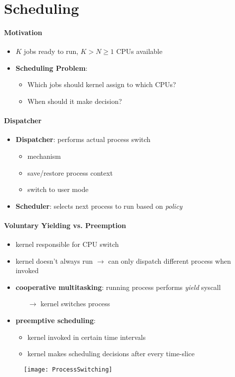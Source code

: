 \section{Scheduling}

\paragraph{Motivation}
\begin{itemize}
  \item \( K \) jobs ready to run, \( K > N \geq 1 \) CPUs available
  \item \textbf{Scheduling Problem}:
  \begin{itemize}
    \item Which jobs should kernel assign to which CPUs?
    \item When should it make decision?
  \end{itemize}
\end{itemize}

\paragraph{Dispatcher}
\begin{itemize}
  \item \textbf{Dispatcher}: performs actual process switch
  \begin{itemize}
    \item mechanism
    \item save/restore process context
    \item switch to user mode
  \end{itemize}
  \item \textbf{Scheduler}: selects next process to run based on \emph{policy}
\end{itemize}

\paragraph{Voluntary Yielding vs. Preemption}
\begin{itemize}
  \item kernel responsible for CPU switch
  \item kernel doesn't always run \( \to \) can only dispatch different process when invoked
  \item \textbf{cooperative multitasking}: running process performs \emph{yield} syscall
  \begin{itemize}
    \item[$ \to $] kernel switches process 
  \end{itemize}
  \item \textbf{preemptive scheduling}:
  \begin{itemize}
    \item kernel invoked in certain time intervals
    \item kernel makes scheduling decisions after every time-slice
  \end{itemize}
\end{itemize}
\begin{figure}[H]\centering\label{ProcessSwitching}\texttt{[image: ProcessSwitching]}\end{figure}

